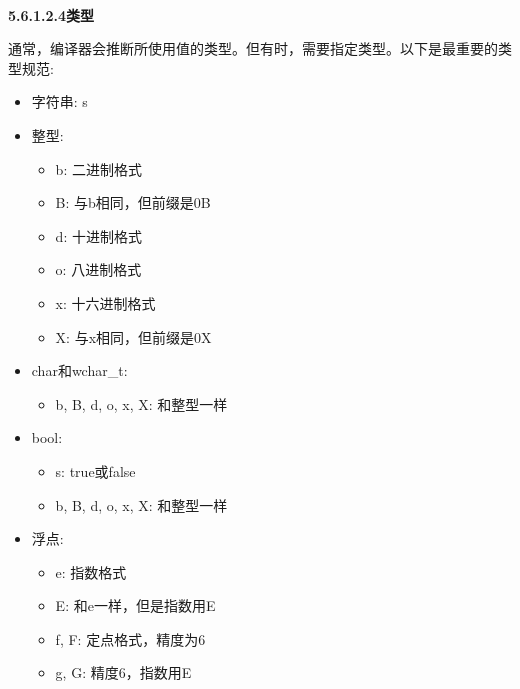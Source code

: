 \hspace*{\fill} \\ %
\noindent
\textbf{5.6.1.2.4\hspace{0.2cm}类型}

通常，编译器会推断所使用值的类型。但有时，需要指定类型。以下是最重要的类型规范:

\begin{itemize}
\item 
字符串: s

\item 
整型:
\begin{itemize}
\item 
b: 二进制格式

\item 
B: 与b相同，但前缀是0B

\item 
d: 十进制格式

\item 
o: 八进制格式

\item 
x: 十六进制格式

\item 
X: 与x相同，但前缀是0X
\end{itemize}

\item 
char和wchar\_t:
\begin{itemize}
\item 
b, B, d, o, x, X: 和整型一样
\end{itemize}

\item 
bool:
\begin{itemize}
\item 
s: true或false

\item 
b, B, d, o, x, X: 和整型一样
\end{itemize}

\item 
浮点:
\begin{itemize}
\item 
e: 指数格式

\item 
E: 和e一样，但是指数用E

\item 
f, F: 定点格式，精度为6

\item 
g, G: 精度6，指数用E
\end{itemize}
\end{itemize}

